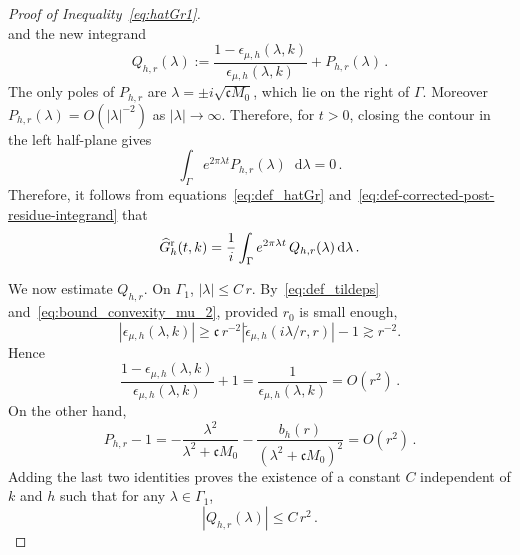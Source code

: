 \documentclass[a4paper,12pt]{amsart} %
\theoremstyle{plain}
\theoremstyle{definition}
\newcommand		{\lt}			{\left}				%
\newcommand		{\rt}			{\right}			%
\renewcommand	{\(}			{\lt(}
\renewcommand	{\)}			{\rt)}
\newcommand		{\n}[1]			{\lt\lvert{#1}\rt\rvert}	%
\renewcommand		{\d}		{\mathop{}\!\mathrm{d}}		%
\newcommand	{\h}			{h}
\newcommand		{\CK}			{\mathfrak{c}}	%
\newcommand		{\hatG}			{\widehat{G}}
\newcommand		{\hatGr}		{\hatG^{\textnormal{r}}}
\begin{document}
\begin{proof}[Proof of Inequality~\eqref{eq:hatGr1}]
\begin{equation}
		\end{equation}
		and the new integrand
		\begin{equation}\label{eq:def-corrected-post-residue-integrand}
			Q_{\h,r}(\lambda) := \frac{1-\epsilon_{\mu,\h}(\lambda,k)}{\epsilon_{\mu,\h}(\lambda,k)} + P_{\h,r}(\lambda) \, .
		\end{equation}
		The only poles of $P_{\h,r}$ are $\lambda = \pm i\sqrt{\CK M_0}$, which lie on the right of $\Gamma$. Moreover $P_{\h,r}(\lambda) = O(\n{\lambda}^{-2})$ as $\n{\lambda}\to\infty$. Therefore, for $t>0$, closing the contour in the left half-plane gives
		\begin{equation}\label{eq:rational-correction-zero-integral}
			\int_\Gamma e^{2\pi\lambda t}P_{\h,r}(\lambda) \d\lambda=0 \, .
		\end{equation}
		Therefore, it follows from equations~\eqref{eq:def_hatGr} and~\eqref{eq:def-corrected-post-residue-integrand} that
		\begin{equation}\label{eq:Gr-corrected-contour}
			\hatGr_\h(t,k) =\frac1i\int_\Gamma e^{2\pi\lambda t} \, Q_{\h,r}(\lambda) \d\lambda \, .
		\end{equation}

		We now estimate $Q_{\h,r}$. On $\Gamma_1$, $\n{\lambda}\leq C\, r$. By~\eqref{eq:def_tildeps} and~\eqref{eq:bound_convexity_mu_2}, provided $r_0$ is small enough,
		\begin{equation*}
			\n{\epsilon_{\mu,\h}(\lambda,k)}
			\geq \CK \, r^{-2} \n{\widetilde\epsilon_{\mu,\h}(i\lambda/r,r)} - 1
			\gtrsim r^{-2}.
		\end{equation*}
		Hence
		\begin{equation*}
			\frac{1-\epsilon_{\mu,\h}(\lambda,k)}{\epsilon_{\mu,\h}(\lambda,k)} + 1 = \frac{1}{\epsilon_{\mu,\h}(\lambda,k)} = O(r^2) \, .
		\end{equation*}
		On the other hand,
		\begin{equation*}
			P_{\h,r}-1 = - \frac{\lambda^2}{\lambda^2+\CK M_0} - \frac{b_\h(r)}{(\lambda^2+\CK M_0)^2} =O(r^2) \, .
		\end{equation*}
		Adding the last two identities proves the existence of a constant $C$ independent of $k$ and $\h$ such that for any $\lambda\in\Gamma_1$,
		\begin{equation}\label{eq:post-residue-central-bound}
			\n{Q_{\h,r}(\lambda)}\leq C\, r^2\, .
		\end{equation}


\end{proof}
\end{document}
